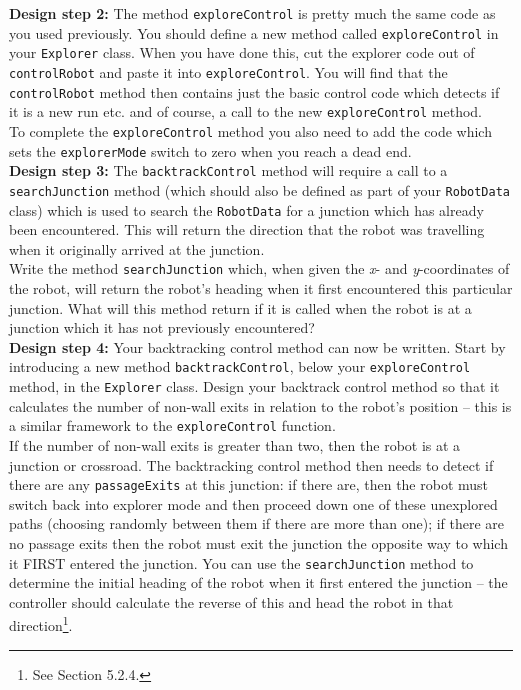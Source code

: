 \noindent
{\bf Design step 2:}
The method {\tt exploreControl} is pretty much the same code as you
used previously. You should define a new method called
{\tt exploreControl} in your {\tt Explorer} class.
When you have done this, cut the explorer code out of {\tt controlRobot}
and paste it into {\tt exploreControl}. You will find that the
{\tt controlRobot} method then contains just the basic
control code which detects if it is a new run etc. and of course, a call
to the new {\tt exploreControl} method.\\

\noindent
To complete the {\tt exploreControl} method you also need to add
the code which sets the {\tt explorerMode} switch to zero when you reach
a dead end. \\

\noindent
{\bf Design step 3:}
The {\tt backtrackControl} method will require a call to a
{\tt searchJunction} method (which should also be defined as part of your
{\tt RobotData} class) which is used to search the {\tt RobotData}
for a junction which has already been encountered. This will return the
direction that the robot was travelling when it originally arrived at the
junction. \\

\noindent
Write the method {\tt searchJunction} which, when given the {\it x}- and
{\it y}-coordinates of the robot, will return the robot's heading when it
first encountered this particular junction.  What will this method
return if it is called when the robot is at a junction which it has not
previously encountered? \\

\noindent
{\bf Design step 4:} Your backtracking control method can now be
written. Start by introducing a new method {\tt backtrackControl},
below your {\tt exploreControl} method, in the {\tt Explorer} class.
Design your backtrack
control method so that it calculates the number of non-wall exits
in relation to the robot's position -- this is a similar framework to
the {\tt exploreControl} function.\\

\noindent
If the number of non-wall exits is greater than two, then the
robot is at a junction or crossroad. The backtracking control method
then needs to detect if there are any {\tt passageExits} at this junction:
if there are, then the robot must switch back into explorer mode
and then proceed down one of these unexplored paths (choosing
randomly between them if there are more than one); if there are
no passage exits then the robot must exit the junction the
opposite way to which it FIRST entered the junction. You can use
the {\tt searchJunction} method to determine the initial heading
of the robot when it first entered the junction -- the controller
should calculate the reverse of this and head the robot in that
direction\footnote{See Section 5.2.4.}.\\

